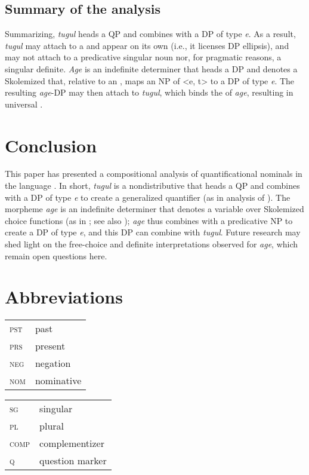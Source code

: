 \documentclass[output=paper,newtxmath,modfonts,nonflat,hidelinks]{langsci/langscibook}
\begin{document}
\subsection{Summary of the analysis}
Summarizing, \textit{tugul} heads a QP and combines with a DP of type \textit{e}. As a result, \textit{tugul} may attach to a  and appear on its own (i.e., it licenses DP ellipsis), and may not attach to a predicative singular noun nor, for pragmatic reasons, a singular definite. \textit{Age} is an indefinite determiner that heads a DP and denotes a Skolemized  that, relative to an , maps an NP of <e, t> to a DP of type \textit{e}. The resulting \textit{age}-DP may then attach to \textit{tugul}, which binds the  of \textit{age}, resulting in universal .

\section{Conclusion} \label{sec:landman:conclusion}
This paper has presented a compositional analysis of quantificational nominals in the  language . In short, \textit{tugul} is a nondistributive  that heads a QP and combines with a DP of type \textit{e} to create a generalized quantifier (as in  analysis of ). The morpheme \textit{age} is an indefinite determiner that denotes a variable over Skolemized choice functions (as in \citealt{Kratzer:1998}; see also \citealt{Matthewson:1999,Matthewson:2001}); \textit{age} thus combines with a predicative NP to create a DP of type \textit{e}, and this DP can combine with \textit{tugul}. Future research may shed light on the free-choice and definite interpretations observed for \textit{age}, which remain open questions here.

\section*{Abbreviations}
\begin{tabularx}{.45\textwidth}{lQ}
\textsc{pst} & past \\
\textsc{prs} &present \\
\textsc{neg} &{negation}\\
\textsc{nom} &{nominative}\\
\end{tabularx}
\begin{tabularx}{.45\textwidth}{lQ}
\textsc{sg}  &singular\\
\textsc{pl}  &plural\\
\textsc{comp}& complementizer\\
\textsc{q}   & question marker\\
\end{tabularx}
\end{document}
